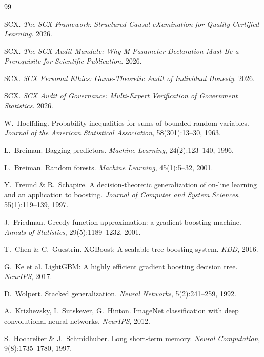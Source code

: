\documentclass[12pt,a4paper]{article}
\theoremstyle{definition}
\begin{document}
\begin{thebibliography}{99}

 SCX. \textit{The SCX Framework: Structured Causal eXamination for Quality-Certified Learning}. 2026.

 SCX. \textit{The SCX Audit Mandate: Why M-Parameter Declaration Must Be a Prerequisite for Scientific Publication}. 2026.

 SCX. \textit{SCX Personal Ethics: Game-Theoretic Audit of Individual Honesty}. 2026.

 SCX. \textit{SCX Audit of Governance: Multi-Expert Verification of Government Statistics}. 2026.

 W.~Hoeffding. Probability inequalities for sums of bounded random variables. \textit{Journal of the American Statistical Association}, 58(301):13--30, 1963.

 L.~Breiman. Bagging predictors. \textit{Machine Learning}, 24(2):123--140, 1996.

 L.~Breiman. Random forests. \textit{Machine Learning}, 45(1):5--32, 2001.

 Y.~Freund \& R.~Schapire. A decision-theoretic generalization of on-line learning and an application to boosting. \textit{Journal of Computer and System Sciences}, 55(1):119--139, 1997.

 J.~Friedman. Greedy function approximation: a gradient boosting machine. \textit{Annals of Statistics}, 29(5):1189--1232, 2001.

 T.~Chen \& C.~Guestrin. XGBoost: A scalable tree boosting system. \textit{KDD}, 2016.

 G.~Ke et al. LightGBM: A highly efficient gradient boosting decision tree. \textit{NeurIPS}, 2017.

 D.~Wolpert. Stacked generalization. \textit{Neural Networks}, 5(2):241--259, 1992.

 A.~Krizhevsky, I.~Sutskever, G.~Hinton. ImageNet classification with deep convolutional neural networks. \textit{NeurIPS}, 2012.

 S.~Hochreiter \& J.~Schmidhuber. Long short-term memory. \textit{Neural Computation}, 9(8):1735--1780, 1997.


\end{thebibliography}
\end{document}
